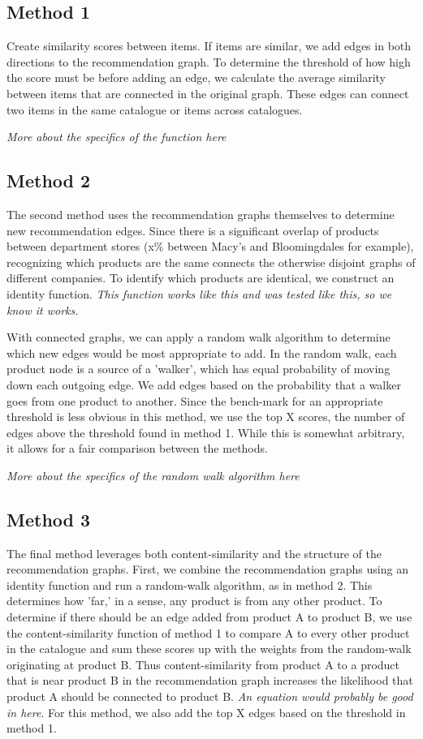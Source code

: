 \documentclass[10pt]{article}
\begin{document}
\subsection*{Method 1}
Create similarity scores between items. If items are similar, we add edges in
both directions to the recommendation graph. To determine the threshold of how
high the score must be before adding an edge, we calculate the average
similarity between items that are connected in the original graph.  These edges
can connect two items in the same catalogue or items across catalogues.

\emph{More about the specifics of the function here}

\subsection*{Method 2}
The second method uses the recommendation graphs themselves to determine new
recommendation edges. Since there is a significant overlap of products between
department stores (x\% between Macy's and Bloomingdales for example),
recognizing which products are the same connects the otherwise disjoint graphs
of different companies. To identify which products are identical, we construct
an identity function. \emph{This function works like this and was tested like
this, so we know it works.}

With connected graphs, we can apply a random walk algorithm to determine which
new edges would be most appropriate to add. In the random walk, each product
node is a source of a 'walker', which has equal probability of moving down each
outgoing edge. We add edges based on the probability that a walker goes from
one product to another. Since the bench-mark for an appropriate threshold is
less obvious in this method, we use the top X scores, the number of edges above
the threshold found in method 1. While this is somewhat arbitrary, it allows
for a fair comparison between the methods.

\emph{More about the specifics of the random walk algorithm here}

\subsection*{Method 3}
The final method leverages both content-similarity and the structure of the
recommendation graphs. First, we combine the recommendation graphs using an
identity function and run a random-walk algorithm, as in method 2. This
determines how 'far,' in a sense, any product is from any other product. To
determine if there should be an edge added from product A to product B, we use
the content-similarity function of method 1 to compare A to every other product
in the catalogue and sum these scores up with the weights from the random-walk
originating at product B. Thus content-similarity from product A to a product
that is near product B in the recommendation graph increases the likelihood
that product A should be connected to product B. \emph{An equation would
probably be good in here}. For this method, we also add the top X edges based
on the threshold in method 1.
\end{document}
